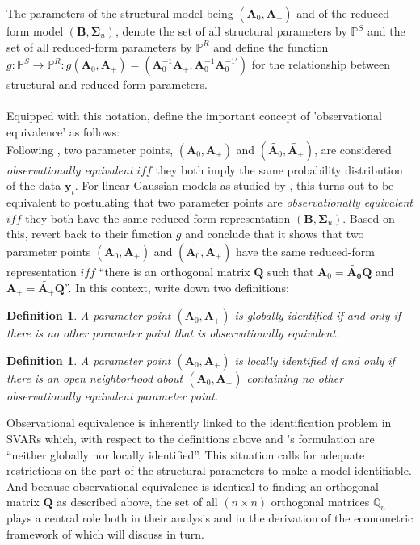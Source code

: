 \documentclass[a4paper,11pt,listof=nochaptergap,oneside,pointednumbers,bibtotoc,bigheadings,liststotoc]{scrbook}
\theoremstyle{mysatz}
\theoremstyle{mydefinition}
\newtheorem{defi}[satz]{Definition}
\theoremstyle{mybemerkung}
\newcommand{\vect}[1]{\boldsymbol{\mathbf{#1}}}
\begin{document}
The parameters of the structural model being $(\vect{A}_0, \vect{A}_+)$ and of the reduced-form model $(\vect{B}, \vect{\Sigma}_u)$, \citet{rubioetal:10} denote the set of all structural parameters by $\mathbb{P}^S$ and the set of all reduced-form parameters by $\mathbb{P}^R$ and define the function $g: \mathbb{P}^S \to \mathbb{P}^R: g(\vect{A}_0, \vect{A}_+) = (\vect{A}_0^{-1}\vect{A}_+, \vect{A}_0^{-1}\vect{A}_0^{-1'})$ for the relationship between structural and reduced-form parameters.\\
\\
Equipped with this notation, \citet{rubioetal:10} define the important concept of 'observational equivalence' as follows: \\
Following \citet{rothenberg:71}, two parameter points, $(\vect{A}_0, \vect{A}_+)$ and $(\widetilde{\vect{A}_0}, \widetilde{\vect{A}_+})$, are considered \textit{observationally equivalent} $iff$ they both imply the same probability distribution of the data $\vect{y}_t$. For linear Gaussian models as studied by \citet{rubioetal:10}, this turns out to be equivalent to postulating that two parameter points are \textit{observationally equivalent} $iff$ they both have the same reduced-form representation $(\vect{B}, \vect{\Sigma}_u)$. Based on this, \citet{rubioetal:10} revert back to their function $g$ and conclude that it shows that two parameter points $(\vect{A}_0, \vect{A}_+)$ and $(\widetilde{\vect{A}_0}, \widetilde{\vect{A}_+})$ have the same reduced-form representation $iff$ ``there is an orthogonal matrix $\vect{Q}$ such that $\vect{A}_0 = \vect{\widetilde{\vect{A}_0}}\vect{Q}$ and $\vect{A}_+ = \widetilde{\vect{A}_+} \vect{Q}$''. In this context, \citet{rubioetal:10} write down two definitions:\\
\begin{defi}
A parameter point $(\vect{A}_0, \vect{A}_+)$ is globally identified if and only if there is no other parameter point that is observationally equivalent.
\end{defi}
\begin{defi}
A parameter point $(\vect{A}_0, \vect{A}_+)$ is locally identified if and only if there is an open neighborhood about $(\vect{A}_0, \vect{A}_+)$ containing no other observationally equivalent parameter point.
\end{defi}

Observational equivalence is inherently linked to the identification problem in SVARs which, with respect to the definitions above and \citet{rubioetal:10}'s formulation are ``neither globally nor locally identified''. This situation calls for adequate restrictions on the part of the structural parameters to make a model identifiable. And because observational equivalence is identical to finding an orthogonal matrix $\vect{Q}$ as described above, the set of all $(n \times n)$ orthogonal matrices $\mathbb{Q}_n$ plays a central role both in their analysis and in the derivation of the econometric framework of \citet{ludvigsonetal:18} which will discuss in turn.
\end{document}
